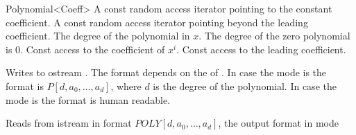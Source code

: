 \begin{ccRefClass}{Polynomial<Coeff>}
{A const random access iterator pointing to the constant coefficient.} \ccGlue
{}
{A const random access iterator pointing beyond the leading coefficient.}\ccGlue
{}
{The degree of the polynomial in $x$. The degree of the zero polynomial is 0.}\ccGlue
{}
{Const access to the coefficient of $x^i$.}\ccGlue
{}
{Const access to the leading coefficient.}\ccGlue


{Writes  to ostream . 
The format depends on the  of .
In case the mode is  the format is $P[d,a_0,\dots,a_d]$,
where $d$ is the degree of the polynomial. 
In case the mode is  the format is human readable.}


{Reads  from istream  in format $POLY[d,a_0,\dots,a_d]$,  
the output format in mode  }


\end{ccRefClass}
